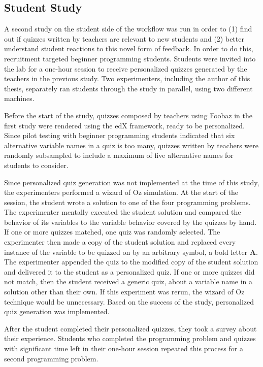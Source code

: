 


\subsection{Student Study}

A second study on the student side of the workflow was run in order to (1) find out if quizzes written by teachers are relevant to new students and (2) better understand student reactions to this novel form of feedback. In order to do this, recruitment targeted beginner programming students. Students were invited into the lab for a one-hour session to receive personalized quizzes generated by the teachers in the previous study. Two experimenters, including the author of this thesis, separately ran students through the study in parallel, using two different machines.

Before the start of the study, quizzes composed by teachers using Foobaz in the first study were rendered using the edX framework, ready to be personalized. Since pilot testing with beginner programming students indicated that six alternative variable names in a quiz is too many, quizzes written by teachers were randomly subsampled to include a maximum of five alternative names for students to consider. 

Since personalized quiz generation was not implemented at the time of this study, the experimenters performed a wizard of Oz simulation. At the start of the session, the student wrote a solution to one of the four programming problems. The experimenter mentally executed the student solution and compared the behavior of its variables to the variable behavior covered by the quizzes by hand. If one or more quizzes matched, one quiz was randomly selected. The experimenter then made a copy of the student solution and replaced every instance of the variable to be quizzed on by an arbitrary symbol, a bold letter {\bf A}. The experimenter appended the quiz to the modified copy of the student solution and delivered it to the student as a personalized quiz. If one or more quizzes did not match, then the student received a generic quiz, about a variable name in a solution other than their own. If this experiment was rerun, the wizard of Oz technique would be unnecessary. Based on the success of the study, personalized quiz generation was implemented.

After the student completed their personalized quizzes, they took a survey about their experience. Students who completed the programming problem and quizzes with significant time left in their one-hour session repeated this process for a second programming problem.

